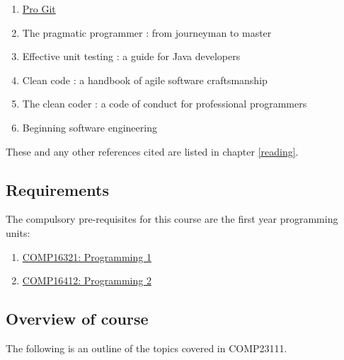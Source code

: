 \documentclass[
]{book}
\providecommand{\tightlist}{%
  \setlength{\itemsep}{0pt}\setlength{\parskip}{0pt}}
\begin{document}
\begin{enumerate}
\def\labelenumi{\arabic{enumi}.}
\tightlist
\item
  \href{https://git-scm.com/book/en/v2}{Pro Git} \citep{progit}
\item
  The pragmatic programmer : from journeyman to master \citep{pragmatic}
\item
  Effective unit testing : a guide for Java developers \citep{unittesting}
\item
  Clean code : a handbook of agile software craftsmanship \citep{cleancode}
\item
  The clean coder : a code of conduct for professional programmers \citep{cleancoder}
\item
  Beginning software engineering \citep{beginning}
\end{enumerate}

These and any other references cited are listed in chapter \ref{reading}.

\hypertarget{prereq}{%
\subsection{Requirements}\label{prereq}}

The compulsory pre-requisites for this course are the first year programming units:

\begin{enumerate}
\def\labelenumi{\arabic{enumi}.}
\tightlist
\item
  \href{https://studentnet.cs.manchester.ac.uk/ugt/COMP16321/syllabus/}{COMP16321: Programming 1}
\item
  \href{https://studentnet.cs.manchester.ac.uk/ugt/COMP16412/syllabus/}{COMP16412: Programming 2}
\end{enumerate}

\hypertarget{courseo}{%
\subsection{Overview of course}\label{courseo}}

The following is an outline of the topics covered in COMP23111.
\end{document}

